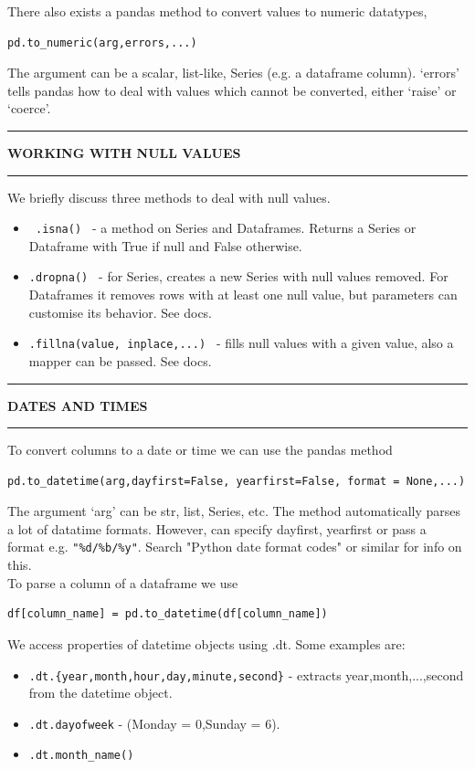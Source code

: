 \documentclass[8pt]{extarticle}
\newcommand{\heading}[1]{%
    \noindent
    \rule{\linewidth}{0.4pt}
    \begin{center}
        \vspace{-1ex}
        \textbf{#1}        
        \vspace{-2.5ex}
    \end{center}
    \rule{\linewidth}{0.4pt}
}
\begin{document}
\begin{multicols}{4}
There also exists a pandas method to convert values to numeric datatypes,
\begin{lstlisting}[style=Python]
pd.to_numeric(arg,errors,...)
\end{lstlisting}The argument can be a scalar, list-like, Series (e.g. a dataframe column). `errors' tells pandas how to deal with values which cannot be converted, either `raise' or `coerce'.

\heading{WORKING WITH NULL VALUES}

We briefly discuss three methods to deal with null values. 
\begin{itemize}
    \item \lstinline[style=Python]! .isna() ! - a method on Series and Dataframes. Returns a Series or Dataframe with True if null and False otherwise.
    \item \lstinline[style=Python]!.dropna() ! - for Series, creates a new Series with null values removed. For Dataframes it removes rows with at least one null value, but parameters can customise its behavior. See docs.
    \item \lstinline[style=Python]!.fillna(value, inplace,...) ! - fills null values with a given value, also a mapper can be passed. See docs.
\end{itemize}

\heading{DATES AND TIMES}

To convert columns to a date or time we can use the pandas method 
\begin{lstlisting}[style=Python]
pd.to_datetime(arg,dayfirst=False, yearfirst=False, format = None,...)
\end{lstlisting}
The argument `arg' can be str, list, Series, etc. The method automatically parses a lot of datatime formats. However, can specify dayfirst, yearfirst or pass a format e.g. \lstinline[style=Python]!"%d/%b/%y"!. Search "Python date format codes" or similar for info on this.\\

To parse a column of a dataframe we use 

\begin{lstlisting}[style=Python]
df[column_name] = pd.to_datetime(df[column_name])
\end{lstlisting}

We access properties of datetime objects using .dt. Some examples are:
\begin{itemize}
    \item \lstinline[style=Python]!.dt.{year,month,hour,day,minute,second}! - extracts year,month,...,second from the datetime object.
    \item \lstinline[style=Python]!.dt.dayofweek! - (Monday = 0,Sunday = 6).
    \item \lstinline[style=Python]!.dt.month_name()!
\end{itemize}


\end{multicols}
\end{document}
